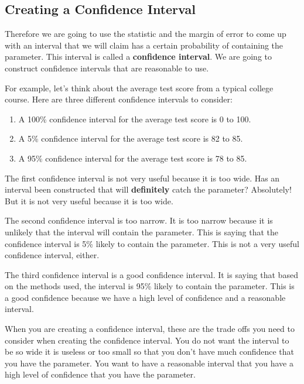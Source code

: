 \documentclass[
  letterpaper,
  DIV=11,
  numbers=noendperiod]{scrreprt}
\begin{document}
\subsection*{Creating a Confidence
Interval}\label{creating-a-confidence-interval}

Therefore we are going to use the statistic and the margin of error to
come up with an interval that we will claim has a certain probability of
containing the parameter. This interval is called a \textbf{confidence
interval}. We are going to construct confidence intervals that are
reasonable to use.

For example, let's think about the average test score from a typical
college course. Here are three different confidence intervals to
consider:

\begin{enumerate}
\def\labelenumi{\arabic{enumi}.}
\item
  A 100\% confidence interval for the average test score is 0 to 100.
\item
  A 5\% confidence interval for the average test score is 82 to 85.
\item
  A 95\% confidence interval for the average test score is 78 to 85.
\end{enumerate}

The first confidence interval is not very useful because it is too wide.
Has an interval been constructed that will \textbf{definitely} catch the
parameter? Absolutely! But it is not very useful because it is too wide.

The second confidence interval is too narrow. It is too narrow because
it is unlikely that the interval will contain the parameter. This is
saying that the confidence interval is 5\% likely to contain the
parameter. This is not a very useful confidence interval, either.

The third confidence interval is a good confidence interval. It is
saying that based on the methods used, the interval is 95\% likely to
contain the parameter. This is a good confidence because we have a high
level of confidence and a reasonable interval.

When you are creating a confidence interval, these are the trade offs
you need to consider when creating the confidence interval. You do not
want the interval to be so wide it is useless or too small so that you
don't have much confidence that you have the parameter. You want to have
a reasonable interval that you have a high level of confidence that you
have the parameter.
\end{document}
